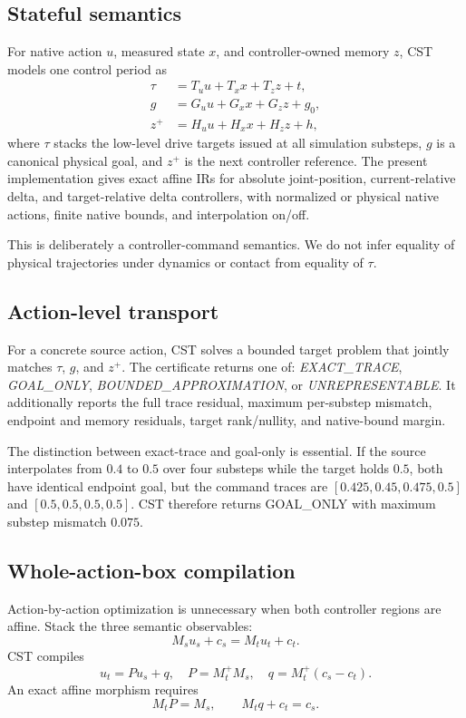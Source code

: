 \documentclass[conference]{IEEEtran}
\begin{document}
\subsection{Stateful semantics}
For native action $u$, measured state $x$, and controller-owned memory $z$,
CST models one control period as
\begin{align}
\tau &= T_u u + T_x x + T_z z + t,\\
g &= G_u u + G_x x + G_z z + g_0,\\
z^+ &= H_u u + H_x x + H_z z + h,
\end{align}
where $\tau$ stacks the low-level drive targets issued at all simulation
substeps, $g$ is a canonical physical goal, and $z^+$ is the next controller
reference. The present implementation gives exact affine IRs for absolute
joint-position, current-relative delta, and target-relative delta controllers,
with normalized or physical native actions, finite native bounds, and
interpolation on/off.

This is deliberately a controller-command semantics. We do not infer equality
of physical trajectories under dynamics or contact from equality of $\tau$.

\subsection{Action-level transport}
For a concrete source action, CST solves a bounded target problem that jointly
matches $\tau$, $g$, and $z^+$. The certificate returns one of:
\emph{EXACT\_TRACE}, \emph{GOAL\_ONLY},
\emph{BOUNDED\_APPROXIMATION}, or \emph{UNREPRESENTABLE}.
It additionally reports the full trace residual, maximum per-substep mismatch,
endpoint and memory residuals, target rank/nullity, and native-bound margin.

The distinction between exact-trace and goal-only is essential. If the source
interpolates from $0.4$ to $0.5$ over four substeps while the target holds
$0.5$, both have identical endpoint goal, but the command traces are
$[0.425,0.45,0.475,0.5]$ and $[0.5,0.5,0.5,0.5]$. CST therefore returns
GOAL\_ONLY with maximum substep mismatch $0.075$.

\subsection{Whole-action-box compilation}
Action-by-action optimization is unnecessary when both controller regions are
affine. Stack the three semantic observables:
\begin{equation}
M_su_s+c_s=M_tu_t+c_t.
\end{equation}
CST compiles
\begin{equation}
u_t=P u_s+q,\quad
P=M_t^+M_s,\quad
q=M_t^+(c_s-c_t).
\end{equation}
An exact affine morphism requires
\begin{equation}
M_tP=M_s,\qquad M_tq+c_t=c_s.
\end{equation}
\end{document}
